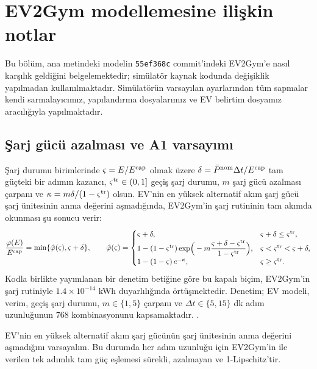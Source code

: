 \section{EV2Gym modellemesine ilişkin notlar}\label{sec:ev2gym}

Bu bölüm, ana metindeki modelin \texttt{55ef368c} commit'indeki EV2Gym'e nasıl karşılık geldiğini belgelemektedir; simülatör kaynak kodunda değişiklik yapılmadan kullanılmaktadır.
Simülatörün varsayılan ayarlarından tüm sapmalar kendi sarmalayıcımız, yapılandırma dosyalarımız ve EV belirtim dosyamız aracılığıyla yapılmaktadır.

\subsection{Şarj gücü azalması ve A1 varsayımı}\label{app:taper}

Şarj durumu birimlerinde $\varsigma=E/E^{\mathrm{cap}}$ olmak üzere $\delta=\bar P^{\mathrm{nom}}\Delta t/E^{\mathrm{cap}}$ tam güçteki bir adımın kazancı, $\varsigma^{\mathrm{tr}}\in(0,1]$ geçiş şarj durumu, $m$ şarj gücü azalması çarpanı ve $\kappa=m\delta/(1-\varsigma^{\mathrm{tr}})$ olsun.
EV'nin en yüksek alternatif akım şarj gücü şarj ünitesinin anma değerini aşmadığında, EV2Gym'in şarj rutininin tam akımda okunması şu sonucu verir:
\begin{equation}\label{eq:taper}
\frac{\varphi(E)}{E^{\mathrm{cap}}}=\min\{\hat\varphi(\varsigma),\varsigma+\delta\},\qquad
\hat\varphi(\varsigma)=\begin{cases}
\varsigma+\delta, & \varsigma+\delta\le\varsigma^{\mathrm{tr}},\\
1-(1-\varsigma^{\mathrm{tr}})\exp\!\Big(-m\dfrac{\varsigma+\delta-\varsigma^{\mathrm{tr}}}{1-\varsigma^{\mathrm{tr}}}\Big), & \varsigma<\varsigma^{\mathrm{tr}}<\varsigma+\delta,\\
1-(1-\varsigma)\,e^{-\kappa}, & \varsigma\ge\varsigma^{\mathrm{tr}}.
\end{cases}
\end{equation}
Kodla birlikte yayımlanan bir denetim betiğine göre bu kapalı biçim, EV2Gym'in şarj rutiniyle $1.4\times10^{-14}$ kWh duyarlılığında örtüşmektedir.
Denetim; EV modeli, verim, geçiş şarj durumu, $m\in\{1,5\}$ çarpanı ve $\Delta t\in\{5,15\}$ dk adım uzunluğunun 768 kombinasyonunu kapsamaktadır.
.

\begin{lemma}[EV2Gym'de A1]\label{lem:taper}
EV'nin en yüksek alternatif akım şarj gücünün şarj ünitesinin anma değerini aşmadığını varsayalım.
Bu durumda her adım uzunluğu için EV2Gym'in  ile verilen tek adımlık tam güç eşlemesi sürekli, azalmayan ve 1-Lipschitz'tir.
\end{lemma}

